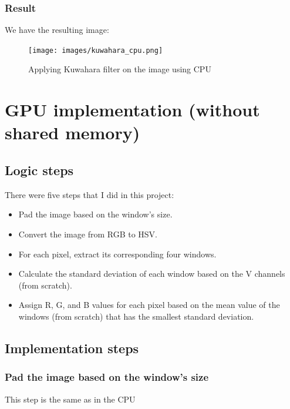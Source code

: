 \documentclass[12pt]{article}
\begin{document}
\subsubsection{Result}
\noindent
We have the resulting image:
\begin{figure}[H]
\centering
    \texttt{[image: images/kuwahara\_cpu.png]}
    \caption{Applying Kuwahara filter on the image using CPU}
\end{figure}

\section{GPU implementation (without shared memory)}

\subsection{Logic steps}
\noindent
There were five steps that I did in this project:

\begin{itemize}
    \item Pad the image based on the window's size.
    \item Convert the image from RGB to HSV.
    \item For each pixel, extract its corresponding four windows.
    \item Calculate the standard deviation of each window based on the V channels (from scratch).
    \item Assign R, G, and B values for each pixel based on the mean value of the windows (from scratch) that has the smallest standard deviation.
\end{itemize}

\subsection{Implementation steps}

\subsubsection{Pad the image based on the window's size}
This step is the same as in the CPU
\end{document}
